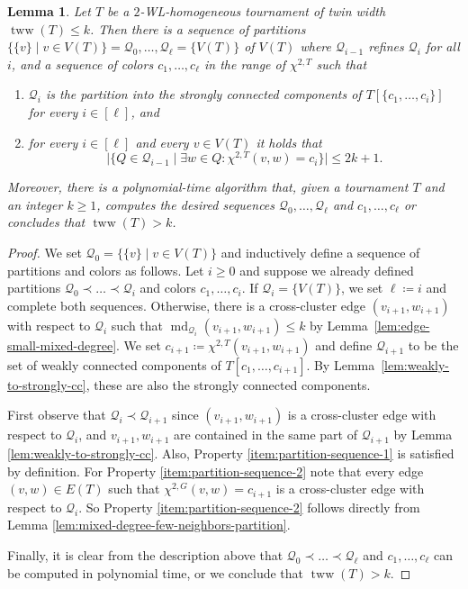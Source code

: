 \PassOptionsToPackage{dvipsnames,svgnames}{xcolor}\documentclass[10pt,a4paper]{article}
\newtheorem{lemma}{Lemma}[section]
\newcommand{\CQ}{{\mathcal Q}}
\newcommand{\bigmid}{\;\big|\;}
\newcommand{\WL}[2]{\chi^{#1,#2}}
\DeclareMathOperator{\md}{md}
\DeclareMathOperator{\tww}{tww}
\begin{document}
\begin{lemma}
 \label{lem:partition-sequence}
 Let $T$ be a $2$-WL-homogeneous tournament of twin width $\tww(T) \leq k$.
 Then there is a sequence of partitions $\{\{v\} \mid v \in V(T)\} = \CQ_0,\dots,\CQ_\ell = \{V(T)\}$ of $V(T)$ where $\CQ_{i-1}$ refines $\CQ_i$ for all $i$,
 and a sequence of colors $c_1,\dots,c_\ell$ in the range of $\WL{2}{T}$ such that
 \begin{enumerate}
  \item\label{item:partition-sequence-1} $\CQ_i$ is the partition into the strongly connected components of $T[\{c_1,\ldots,c_i\}]$ for every $i \in [\ell]$, and
  \item\label{item:partition-sequence-2} for every $i \in [\ell]$ and every $v \in V(T)$ it holds that
  \[\big|\big\{Q \in \CQ_{i-1} \bigmid \exists w \in Q \colon \WL{2}{T}(v,w) = c_i\big\}\big| \leq 2k+1.\]
 \end{enumerate}
 Moreover, there is a polynomial-time algorithm that, given a tournament $T$ and an integer $k \geq 1$, computes the desired sequences $\CQ_0,\dots,\CQ_\ell$ and $c_1,\dots,c_\ell$ or concludes that $\tww(T) > k$.
\end{lemma}

\begin{proof}
 We set $\CQ_0 = \{\{v\} \mid v \in V(T)\}$ and inductively define a sequence of partitions and colors as follows.
 Let $i \geq 0$ and suppose we already defined partitions $\CQ_0 \prec \dots \prec \CQ_i$ and colors $c_1,\dots,c_i$.
 If $\CQ_i = \{V(T)\}$, we set $\ell \coloneqq i$ and complete both sequences.
 Otherwise, there is a cross-cluster edge $(v_{i+1},w_{i+1})$ with respect to $\CQ_i$ such that $\md_{\CQ_i}(v_{i+1},w_{i+1}) \leq k$ by Lemma~\ref{lem:edge-small-mixed-degree}.
 We set $c_{i+1} \coloneqq \WL{2}{T}(v_{i+1},w_{i+1})$ and define $\CQ_{i+1}$ to be the set of weakly connected components of $T[c_1,\dots,c_{i+1}]$.
 By Lemma~\ref{lem:weakly-to-strongly-cc}, these are also the strongly connected components.

 First observe that $\CQ_i \prec \CQ_{i+1}$ since $(v_{i+1},w_{i+1})$ is a cross-cluster edge with respect to $\CQ_i$, and $v_{i+1},w_{i+1}$ are contained in the same part of $\CQ_{i+1}$ by Lemma \ref{lem:weakly-to-strongly-cc}.
 Also, Property \ref{item:partition-sequence-1} is satisfied by definition.
 For Property \ref{item:partition-sequence-2} note that every edge $(v,w) \in E(T)$ such that $\WL{2}{G}(v,w) = c_{i+1}$ is a cross-cluster edge with respect to $\CQ_i$.
 So Property \ref{item:partition-sequence-2} follows directly from Lemma \ref{lem:mixed-degree-few-neighbors-partition}.

 Finally, it is clear from the description above that $\CQ_0 \prec \dots \prec \CQ_\ell$ and $c_1,\dots,c_\ell$ can be computed in polynomial time, or we conclude that $\tww(T) > k$.
\end{proof}
\end{document}

